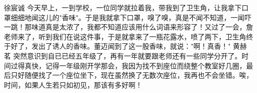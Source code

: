 {}\markdownRendererInterblockSeparator
{}徐宸诚\markdownRendererInterblockSeparator
{}今天早上，一到学校，一位同学就拉着我，带我到了卫生角，让我拿下口罩细细地闻这儿的"香味"。于是我就拿下口罩，嗅了嗅，真是不闻不知道，一闻吓一跳！那味道真是太浓了，我都不知道应该用什么词语来形容了！又过了一会，詹老师来了，听到我们在说这件事，于是就拿来了一瓶花露水，喷了两下，卫生角终于好了，发出了诱人的香味。董迈闻到了这一股香味，就说："啊！真香！"\markdownRendererInterblockSeparator
{}\markdownRendererInterblockSeparator
{}黄赫茗\markdownRendererInterblockSeparator
{}突然意识到自已已经五年级了，再有一年就要跟老师还有一些同学分开了。时间过得真快，记得一年级刚开学那会，我因为找不到座位而绕整个教室好几圈，最后只好随便找了一个座位坐下，现在虽然换了无数次座位，我再也不会坐错。唉，时间，如果人生若只如初见，那该有多好啊！\relax